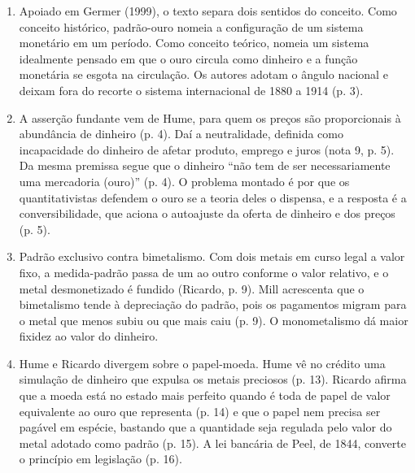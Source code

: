 \begin{enumerate}[leftmargin=*,nosep]
\item Apoiado em Germer (1999), o texto separa dois sentidos do conceito. Como
conceito histórico, padrão-ouro nomeia a configuração de um sistema monetário
em um período. Como conceito teórico, nomeia um sistema idealmente pensado em
que o ouro circula como dinheiro e a função monetária se esgota na circulação.
Os autores adotam o ângulo nacional e deixam fora do recorte o sistema
internacional de 1880 a 1914 (p. 3).

\item A asserção fundante vem de Hume, para quem os preços são proporcionais à
abundância de dinheiro (p. 4). Daí a neutralidade, definida como incapacidade
do dinheiro de afetar produto, emprego e juros (nota 9, p. 5). Da mesma
premissa segue que o dinheiro ``não tem de ser necessariamente uma mercadoria
(ouro)'' (p. 4). O problema montado é por que os quantitativistas defendem o
ouro se a teoria deles o dispensa, e a resposta é a conversibilidade, que
aciona o autoajuste da oferta de dinheiro e dos preços (p. 5).

\item Padrão exclusivo contra bimetalismo. Com dois metais em curso legal a
valor fixo, a medida-padrão passa de um ao outro conforme o valor relativo, e o
metal desmonetizado é fundido (Ricardo, p. 9). Mill acrescenta que o
bimetalismo tende à depreciação do padrão, pois os pagamentos migram para o
metal que menos subiu ou que mais caiu (p. 9). O monometalismo dá maior fixidez
ao valor do dinheiro.

\item Hume e Ricardo divergem sobre o papel-moeda. Hume vê no crédito uma
simulação de dinheiro que expulsa os metais preciosos (p. 13). Ricardo afirma
que a moeda está no estado mais perfeito quando é toda de papel de valor
equivalente ao ouro que representa (p. 14) e que o papel nem precisa ser
pagável em espécie, bastando que a quantidade seja regulada pelo valor do metal
adotado como padrão (p. 15). A lei bancária de Peel, de 1844, converte o
princípio em legislação (p. 16).
\end{enumerate}



